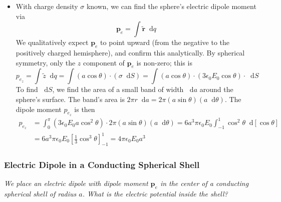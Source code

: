 \documentclass[11pt, a4paper]{article}
\newcommand{\diff}{\mathop{}\!\mathrm{d}} %
\renewcommand{\vec}[1]{\bm{#1}} %
\newcommand{\tvec}[1]{\tilde{\vec{#1}}} %
\newcommand{\e}{\epsilon_{0}}  %
\newcommand{\pe}{\vec{p}_{e}} %
\begin{document}
\begin{itemize}
	\item With charge density $ \sigma $ known, we can find the sphere's electric dipole moment via
	\begin{equation*}
		\vec{p}_{e} = \int \tvec{r} \diff q
	\end{equation*}
	We qualitatively expect $ \vec{p}_{e} $ to point upward (from the negative to the positively charged hemisphere), and confirm this analytically. By spherical symmetry, only the $ z $ component of $ \vec{p}_{e} $ is non-zero; this is
	\begin{equation*}
		p_{e_{z}} = \int \tilde{z} \diff q = \int (a \cos \theta) \cdot (\sigma \diff S) = \int( a \cos \theta) \cdot (3 \e E_{0} \cos \theta) \cdot \diff S
	\end{equation*}
	To find $ \diff S $, we find the area of a small band of width $ \diff a $ around the sphere's surface. The band's area is $ 2\pi r \diff a = 2\pi (a \sin \theta ) (a \diff \theta) $. The dipole moment $ p_{e_{z}} $ is then
	\begin{align*}
		p_{e_{z}} &= \int_{0}^{\pi}(3\e E_{0}a\cos^{2}\theta) \cdot 2\pi (a \sin \theta ) (a \diff \theta) = 6a^{3}\pi \e E_{0} \int_{-1}^{1}\cos^{2}\theta \diff [\cos \theta]\\
		& = 6a^{3}\pi \e E_{0} \left[\frac{1}{3}\cos^{3}\theta \right]_{-1}^{1} = 4\pi \e E_{0} a^{3}
	\end{align*}
\end{itemize}

\subsubsection{Electric Dipole in a Conducting Spherical Shell}
\textit{We place an electric dipole with dipole moment $ \pe $ in the center of a conducting spherical shell of radius $ a $. What is the electric potential inside the shell?}
\end{document}
